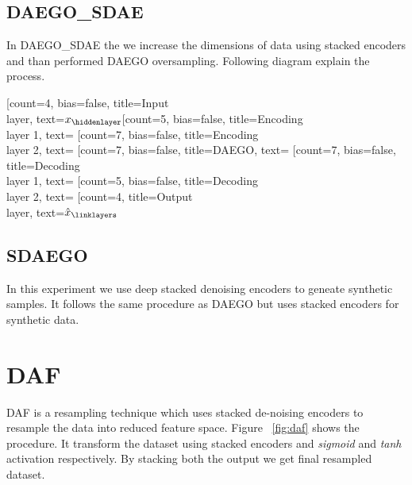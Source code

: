 \documentclass[a4paper,11pt]{report}
\begin{document}
\subsection*{DAEGO\_SDAE}

In DAEGO\_SDAE the we increase the dimensions of data using stacked encoders and than performed DAEGO oversampling. Following diagram explain the process.


\begin{neuralnetwork}[height=8, layertitleheight=1cm, nodespacing=1cm, layerspacing=2cm]
		\newcommand{\nodetextclear}[2]{}
		\newcommand{\nodetextx}[2]{$x_#2$}
		\newcommand{\nodetexty}[2]{$\hat{x}_#2$}
		[count=4, bias=false, title=Input\\layer, text=\nodetextx]
		\hiddenlayer[count=5, bias=false, title=Encoding\\layer 1, text=\nodetextclear] \linklayers
		\hiddenlayer[count=7, bias=false, title=Encoding\\layer 2, text=\nodetextclear] \linklayers
		\hiddenlayer[count=7, bias=false, title=DAEGO, text=\nodetextclear] \linklayers
		\hiddenlayer[count=7, bias=false, title=Decoding\\layer 1, text=\nodetextclear] \linklayers
		\hiddenlayer[count=5, bias=false, title=Decoding\\layer 2, text=\nodetextclear] \linklayers
		\outputlayer[count=4, title=Output\\layer, text=\nodetexty] \linklayers
	\end{neuralnetwork}
	
\subsection*{SDAEGO}

In this experiment we use deep stacked denoising encoders to geneate synthetic samples. It follows the same procedure as DAEGO but uses stacked encoders for synthetic data.

\section*{DAF}

DAF\cite{ng2016dual} is a resampling technique which uses stacked de-noising encoders to resample the data into reduced feature space. Figure ~\ref{fig:daf} shows the procedure. It transform the dataset using stacked encoders and \textit{sigmoid} and \textit{tanh} activation respectively. By stacking both the output we get final resampled dataset.  
\end{document}
